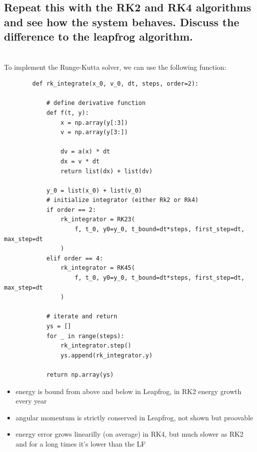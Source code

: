 \newpage
\subsection{Repeat this with the RK2 and RK4 algorithms and see how the 
    system behaves. Discuss the difference to the leapfrog algorithm.
} \ \\
    To implement the Runge-Kutta solver, we can use the following function: \\
    \begin{lstlisting}
        def rk_integrate(x_0, v_0, dt, steps, order=2):
        
            # define derivative function
            def f(t, y):
                x = np.array(y[:3])
                v = np.array(y[3:])
        
                dv = a(x) * dt
                dx = v * dt
                return list(dx) + list(dv)
        
            y_0 = list(x_0) + list(v_0)
            # initialize integrator (either Rk2 or Rk4)
            if order == 2:
                rk_integrator = RK23(
                    f, t_0, y0=y_0, t_bound=dt*steps, first_step=dt, max_step=dt
                )
            elif order == 4:
                rk_integrator = RK45(
                    f, t_0, y0=y_0, t_bound=dt*steps, first_step=dt, max_step=dt
                )
        
            # iterate and return
            ys = []
            for _ in range(steps):
                rk_integrator.step()
                ys.append(rk_integrator.y)
        
            return np.array(ys)\end{lstlisting}
    \begin{itemize}
        \item energy is bound from above and below in Leapfrog, in RK2 energy growth every year
        \item angular momentum is strictly conserved in Leapfrog, not shown but proovable
        \item energy error grows linearilly (on average) in RK4, but much slower as RK2 and for a long times it's lower than the LF 
    \end{itemize}
    \newpage

